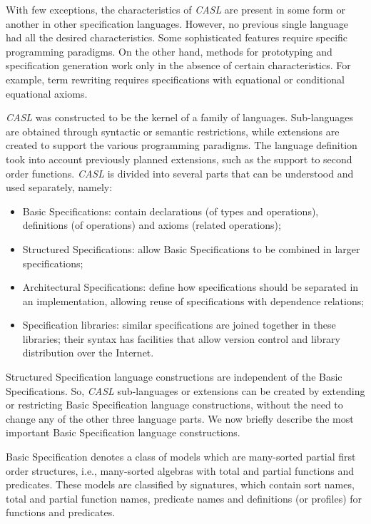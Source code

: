 \documentclass[12pt,twoside]{article}
\numberwithin{spec}{subsection}
\numberwithin{proof}{subsection}
\numberwithin{figure}{subsection}
\numberwithin{code}{subsection}
\begin{document}
With few exceptions, the characteristics of \textit{CASL} are present in some form or another in other specification languages. However, no previous single language had all the desired characteristics. Some sophisticated features require specific programming paradigms. On the other hand, methods for prototyping and specification generation work only in the absence of certain characteristics. For example, term rewriting requires specifications with equational or conditional equational axioms.

\textit{CASL} was constructed to be the kernel of a family of languages. Sub-languages are obtained through syntactic or semantic restrictions, while extensions are created to support the various programming paradigms. The language definition took into account previously planned extensions, such as the support to second order functions. \textit{CASL} is divided into several parts that can be understood and used separately, namely: 
\begin{itemize} 
\item Basic Specifications: contain declarations (of types and operations), definitions (of operations) and axioms (related operations); 
\item Structured Specifications: allow Basic Specifications to be combined in larger specifications; 
\item Architectural Specifications: define how specifications should be separated in an implementation, allowing reuse of specifications with dependence relations;
\item Specification libraries: similar specifications are joined together in these libraries; their syntax has facilities that allow version control and library distribution over the Internet.
\end{itemize}

Structured Specification language constructions are independent of the Basic Specifications. So, \textit{CASL} sub-languages or extensions can be created by extending or restricting Basic Specification language constructions, without the need to change any of the other three language parts. We now briefly describe the most important Basic Specification language constructions.

Basic Specification denotes a class of models which are many-sorted partial first order structures, i.e., many-sorted algebras with total and partial functions and predicates. These models are classified by signatures, which contain sort names, total and partial function names, predicate names and definitions (or profiles) for functions and predicates.
\end{document}
